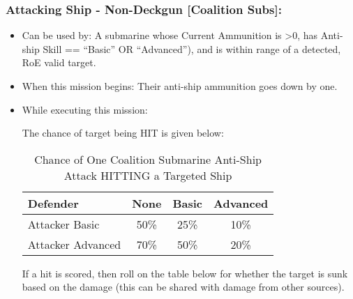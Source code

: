 \documentclass{article}
\begin{document}
    \subsubsection{Attacking Ship - Non-Deckgun [Coalition Subs]:}
       \begin{itemize}
            \item{Can be used by:} A submarine whose Current Ammunition is \textgreater 0, has Anti-ship Skill == ``Basic'' OR ``Advanced''), and is within range of a detected, RoE valid target.
            \item{When this mission begins:} Their anti-ship ammunition goes down by one.\\ 
            \item{While executing this mission:}
            
            The chance of target being HIT is given below:\\
            \begin{table}[h!]
                \centering
                \begin{tabular}{lccc}
                    \toprule
                    Defender & None & Basic & Advanced \\
                    \midrule
                    Attacker Basic    & 50\%  & 25\% & 10\% \\
                    Attacker Advanced & 70\%  & 50\% & 20\% \\
                    \bottomrule
                \end{tabular}
                \caption{Chance of One Coalition Submarine Anti-Ship Attack HITTING a Targeted Ship}
                \label{tab:CoalitionSubmarinesHitProbabilityvs.Ships}
            \end{table}

            If a hit is scored, then roll on the table below for whether the target is sunk based on the damage (this can be shared with damage from other sources).


\end{itemize}
\end{document}
